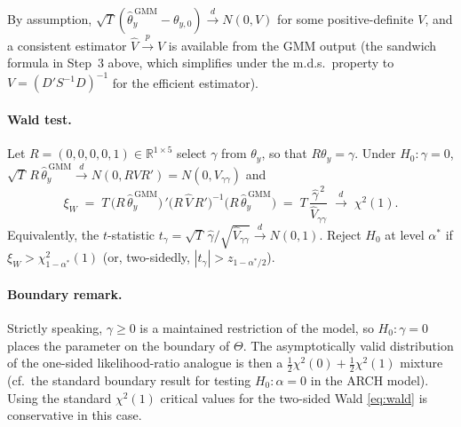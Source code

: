 \documentclass[12pt]{article}
\begin{document}
By assumption, $\sqrt{T}(\widehat{\theta}_y^{\,\text{GMM}}-\theta_{y,0})\xrightarrow{d} N(0,V)$ for some positive-definite $V$, and a consistent estimator $\widehat{V}\xrightarrow{p}V$ is available from the GMM output (the sandwich formula in Step~3 above, which simplifies under the m.d.s.\ property to $V=(D'S^{-1}D)^{-1}$ for the efficient estimator).

\paragraph{Wald test.} Let $R=(0,0,0,0,1)\in\mathbb{R}^{1\times 5}$ select $\gamma$ from $\theta_y$, so that $R\theta_y=\gamma$. Under $H_0:\gamma=0$, $\sqrt{T}\,R\,\widehat{\theta}_y^{\,\text{GMM}}\xrightarrow{d} N(0,RVR')=N(0,V_{\gamma\gamma})$ and
\begin{equation}
\xi_W \;=\; T\,\big(R\,\widehat{\theta}_y^{\,\text{GMM}}\big)\!\!\,'\big(R\,\widehat{V}\,R'\big)^{-1}\big(R\,\widehat{\theta}_y^{\,\text{GMM}}\big)
\;=\; T\,\frac{\widehat{\gamma}^{\,2}}{\widehat{V}_{\gamma\gamma}}\;\xrightarrow{d}\;\chi^2(1).\label{eq:wald}
\end{equation}
Equivalently, the $t$-statistic $t_\gamma=\sqrt{T}\,\widehat{\gamma}/\sqrt{\widehat{V}_{\gamma\gamma}}\xrightarrow{d} N(0,1)$. Reject $H_0$ at level $\alpha^{*}$ if $\xi_W>\chi^2_{1-\alpha^{*}}(1)$ (or, two-sidedly, $|t_\gamma|>z_{1-\alpha^{*}/2}$).

\paragraph{Boundary remark.} Strictly speaking, $\gamma\geq 0$ is a maintained restriction of the model, so $H_0:\gamma=0$ places the parameter on the boundary of $\Theta$. The asymptotically valid distribution of the one-sided likelihood-ratio analogue is then a $\tfrac{1}{2}\chi^2(0)+\tfrac{1}{2}\chi^2(1)$ mixture (cf.\ the standard boundary result for testing $H_0:\alpha=0$ in the ARCH model). Using the standard $\chi^2(1)$ critical values for the two-sided Wald \eqref{eq:wald} is conservative in this case.
\end{document}
